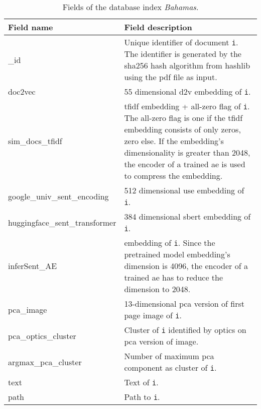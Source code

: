 \begin{table}[]
    \caption{Fields of the \databaseName{} database index \textit{Bahamas}.}
    \begin{tabular}{|
    >{\columncolor[HTML]{EFEFEF}}l |p{}|}
    \hline
    \cellcolor[HTML]{C0C0C0}\textbf{Field name} & \cellcolor[HTML]{C0C0C0}\textbf{Field description}                                     \\ \hline
    \_id                                        & Unique identifier of document \texttt{i}. The identifier is generated by the sha256 hash algorithm from hashlib using the \ac{pdf} file as input.\\ \hline
    doc2vec                                     & 55 dimensional \ac{d2v} embedding of \texttt{i}.                                                          \\ \hline
    sim\_docs\_tfidf                            & \ac{tfidf} embedding + all-zero flag of \texttt{i}. The all-zero flag is one if the \ac{tfidf} embedding consists of only zeros, zero else. If the embedding's dimensionality is greater than 2048, the encoder of a trained \ac{ae} is used to compress the embedding.\\ \hline
    google\_univ\_sent\_encoding                & 512 dimensional \ac{use} embedding of \texttt{i}.                                     \\ \hline
    huggingface\_sent\_transformer              & 384 dimensional \ac{sbert} embedding of \texttt{i}.                                  \\ \hline
    inferSent\_AE                               & \infersent{} embedding of \texttt{i}. Since the pretrained \infersent{} model embedding's dimension is 4096, the encoder of a trained \ac{ae} has to reduce the dimension to 2048.                                                    \\ \hline
    pca\_image                                  & 13-dimensional \ac{pca} version of first page image of \texttt{i}.                      \\ \hline
    pca\_optics\_cluster                        & Cluster of \texttt{i} identified by \acs{optics} on \ac{pca} version of image.            \\ \hline
    argmax\_pca\_cluster                        & Number of maximum \ac{pca} component as cluster of \texttt{i}.                            \\ \hline
    text                                        & Text of \texttt{i}.                                                                       \\ \hline
    path                                        & Path to \texttt{i}.                                                     \\ \hline
    \end{tabular}
    \label{tbl:Elasticsearch-fields}
\end{table}

